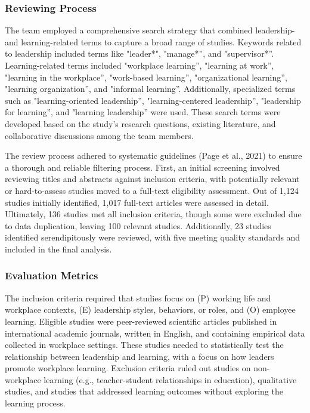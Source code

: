 \subsubsection{Reviewing Process}
The team employed a comprehensive search strategy that combined leadership- and learning-related
terms to capture a broad range of studies. Keywords related to leadership included terms like
"leader*", "manage*”, and "supervisor*”. Learning-related terms included "workplace learning”,
"learning at work”, "learning in the workplace”, "work-based learning”, "organizational learning”,
"learning organization”, and "informal learning”. Additionally, specialized terms such as
"learning-oriented leadership”, "learning-centered leadership”, "leadership for learning”, and
"learning leadership” were used. These search terms were developed based on the study's research
questions, existing literature, and collaborative discussions among the team members.

The review process adhered to systematic guidelines (Page et al., 2021) to ensure a thorough and
reliable filtering process. First, an initial screening involved reviewing titles and abstracts
against inclusion criteria, with potentially relevant or hard-to-assess studies moved to a full-text
eligibility assessment. Out of 1,124 studies initially identified, 1,017 full-text articles were
assessed in detail. Ultimately, 136 studies met all inclusion criteria, though some were excluded
due to data duplication, leaving 100 relevant studies. Additionally, 23 studies identified
serendipitously were reviewed, with five meeting quality standards and included in the final
analysis.

\subsubsection{Evaluation Metrics}
The inclusion criteria required that studies focus on (P) working life and workplace contexts, (E)
leadership styles, behaviors, or roles, and (O) employee learning. Eligible studies were
peer-reviewed scientific articles published in international academic journals, written in English,
and containing empirical data collected in workplace settings. These studies needed to statistically
test the relationship between leadership and learning, with a focus on how leaders promote workplace
learning. Exclusion criteria ruled out studies on non-workplace learning (e.g., teacher-student
relationships in education), qualitative studies, and studies that addressed learning outcomes
without exploring the learning process.

